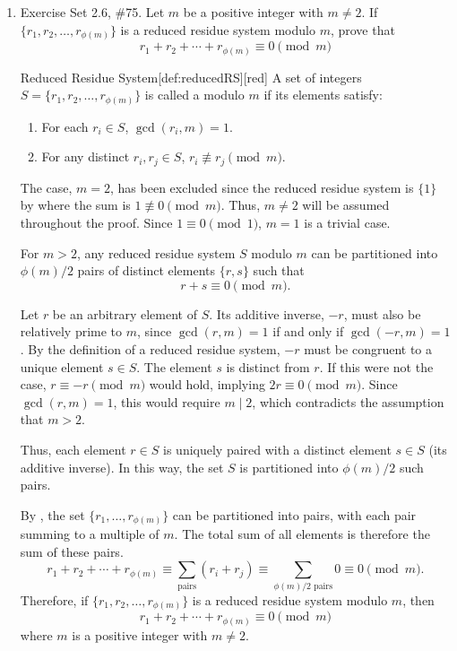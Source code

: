 \begin{enumerate}
  \newpage
  \item Exercise Set 2.6, \#75.
  Let $m$ be a positive integer with $m \neq 2$. If $\{r_1, r_2, \ldots, r_{\phi(m)}\}$ is a reduced residue system modulo $m$, prove that
  \[
  r_1+r_2+\cdots+r_{\phi(m)} \equiv 0 \pmod{m}
  \]
  \begin{define}{Reduced Residue System}[def:reducedRS][red]
  A set of integers $S = \{r_1, r_2, \ldots, r_{\phi(m)}\}$ is called a  modulo $m$ if its elements satisfy:
  \begin{enumerate}
    \item For each $r_i \in S$, $\gcd(r_i, m) = 1$.
    \item For any distinct $r_i, r_j \in S$, $r_i \not\equiv r_j \pmod{m}$.
  \end{enumerate}
  \end{define}
  \begin{subprove}
    The case, $m=2$, has been excluded since 
    the reduced residue system is $\{1\}$ by  where the sum is $1 \not\equiv 0 \pmod m$.
    Thus, $m \neq 2$ will be assumed throughout the proof. Since $1 \equiv 0 \pmod 1$, $m=1$ is a trivial case.
    \begin{claim}
    For $m>2$, any reduced residue system $S$ modulo $m$ can be partitioned into $\phi(m)/2$ pairs of distinct elements $\{r, s\}$ such that
    \[
      r + s \equiv 0 \pmod m.
    \]
    \begin{subprove}
      Let $r$ be an arbitrary element of $S$. Its additive inverse, 
      $-r$, must also be relatively prime to $m$, since $\gcd(r,m)=1$ 
      if and only if $\gcd(-r,m)=1$. By the definition of a reduced residue system, 
      $-r$ must be congruent to a unique element $s \in S$.
      The element $s$ is distinct from $r$. If this were not the case, 
      $r \equiv -r \pmod m$ would hold, implying $2r \equiv 0 \pmod m$. 
      Since $\gcd(r, m) = 1$, this would require $m \mid 2$, 
      which contradicts the assumption that $m > 2$.

      Thus, each element $r \in S$ is uniquely paired with a distinct element $s \in S$ (its additive inverse). 
      In this way, the set $S$ is partitioned into $\phi(m)/2$ such pairs.
    \end{subprove}
    \end{claim}
    By , the set $\{r_1, \ldots, r_{\phi(m)}\}$ can be 
    partitioned into pairs, with each pair summing to a multiple of $m$. 
    The total sum of all elements is therefore the sum of these pairs.
    \[
      r_1+r_2+\cdots+r_{\phi(m)} \equiv \sum_{\text{pairs}} (r_i+r_j) \equiv \sum_{\phi(m)/2 \text{ pairs}} 0 \equiv 0 \pmod{m}.
    \]
    Therefore, if $\{r_1, r_2, \ldots, r_{\phi(m)}\}$ is a reduced residue system modulo $m$, then
    \[
    r_1+r_2+\cdots+r_{\phi(m)} \equiv 0 \pmod{m}
    \]
    where $m$ is a positive integer with $m \neq 2$.
  \end{subprove}




\end{enumerate}
